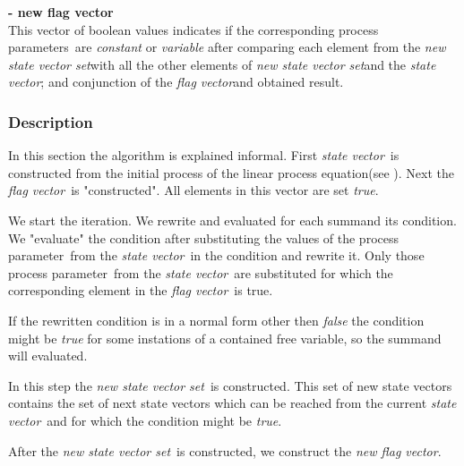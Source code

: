 \documentclass[a4paper,10pt]{article}
\newcommand{\lpe}{linear process equation}
\newcommand{\ovr}{\overrightarrow}
\newcommand{\pp}{process parameter}
\newcommand{\pps}{process parameters}
\newcommand{\ti}{\textit}
\newcommand{\sv}{\textit{state vector}}
\newcommand{\fv}{\textit{flag vector}}
\newcommand{\svs}{\textit{new state vector set}}
\newcommand{\nfv}{\textit{new flag vector}}
\begin{document}
\begin{defn}
\textbf{- new flag vector} \\
This vector of boolean values indicates if the
corresponding \pps\ are \ti{constant} or \ti{variable} after comparing each element from the \svs with all the other elements of \svs  and the \sv; and conjunction of the \fv and obtained result. 
\end{defn}

\subsubsection{Description}\label{sss:desc}
In this section the algorithm is explained informal. First \sv\ is constructed from the initial process of the \lpe (see \cite{LPE_info}). Next the \fv\ is "constructed".
All elements in this vector are set \ti{true}.

We start the iteration. We rewrite and evaluated for each summand its condition. We "evaluate" the condition after substituting the values of the \pp\ from the \sv\ in the condition and rewrite it. Only those \pp\ from the \sv\ are substituted for which the corresponding element in the \fv\ is true. 

If the rewritten condition is in a normal form other then \ti{false} the condition might be \ti{true} for some instations of a contained free variable, so the summand will evaluated. 

In this step the \svs\ is constructed. This set of new state vectors contains the set of next state vectors which can be reached from the current \sv\ and for which the condition might be \ti{true}. 

After the \svs\ is constructed, we construct the \nfv . 

\end{document}
